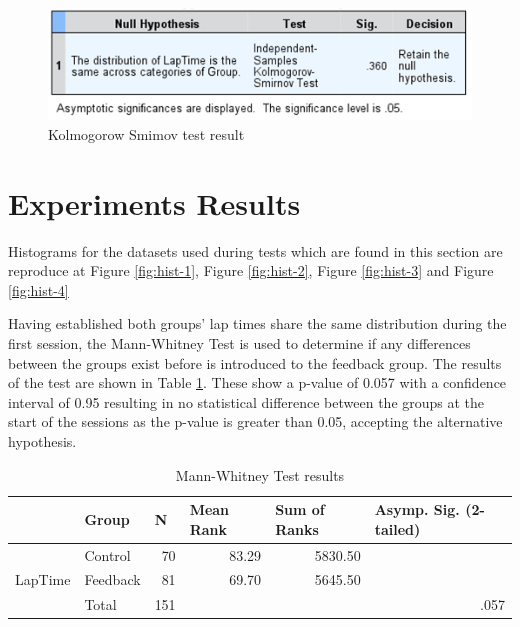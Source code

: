 \begin{figure}[!htb]
	\centering
	\includegraphics[width=\textwidth]{images/KolmogorowSmimov.png}
	\caption[Kolmogorow Smimov Test]{Kolmogorow Smimov test result}
	\label{fig:chart-KolmogorowSmimov}
\end{figure}

\section{Experiments Results}
\label{sec:eval-ExperimentsResults}

Histograms for the datasets used during tests which are found in this section are reproduce at Figure \ref{fig:hist-1}, Figure \ref{fig:hist-2}, Figure \ref{fig:hist-3} and Figure \ref{fig:hist-4}

Having established both groups' lap times share the same distribution during the first session, the Mann-Whitney Test is used to determine if any differences between the groups exist before \methodname is introduced to the feedback group. The results of the test are shown in Table \ref{table:Mann-Whitney}. These show a p-value of 0.057 with a confidence interval of 0.95 resulting in no statistical difference between the groups at the start of the sessions as the p-value is greater than 0.05, accepting the alternative hypothesis.

\begin{table}[!htb]
	\centering
	\begin{tabular}{|ll|r|rr|r|}
		\hline
		& Group    & \multicolumn{1}{l|}{N} & \multicolumn{1}{l|}{Mean Rank} & \multicolumn{1}{l|}{Sum of Ranks} & \multicolumn{1}{l|}{Asymp. Sig. (2-tailed)} \\ \hline
		\multicolumn{1}{|l|}{\multirow{3}{*}{LapTime}} & Control  & 70                     & \multicolumn{1}{r|}{83.29}     & 5830.50                           &                                             \\ \cline{2-5}
		\multicolumn{1}{|l|}{}                         & Feedback & 81                     & \multicolumn{1}{r|}{69.70}     & 5645.50                           &                                             \\ \cline{2-5}
		\multicolumn{1}{|l|}{}                         & Total    & 151                    &                                &                                   & .057                                        \\ \hline
	\end{tabular}
	\caption[Mann-Whitney Test results]{Mann-Whitney Test results}
	\label{table:Mann-Whitney}
\end{table}

